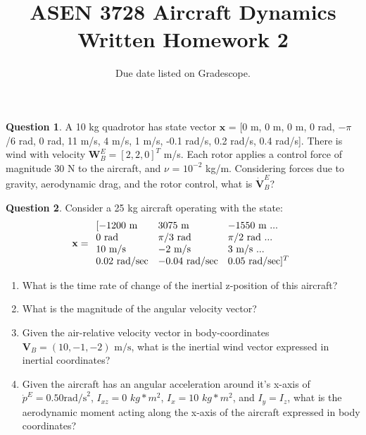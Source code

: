 \documentclass{article}
\title{ASEN 3728 Aircraft Dynamics\\Written Homework 2}
\date{Due date listed on Gradescope.}
\theoremstyle{definition}
\newtheorem{question}{Question}
\begin{document}

\maketitle

\begin{question}
    A 10 kg quadrotor has state vector $\mathbf{x}$ = [0 m, 0 m, 0 m, 0 rad, $-\pi$/6 rad, 0 rad, 11 m/s, 4 m/s, 1 m/s, -0.1 rad/s, 0.2 rad/s, 0.4 rad/s]. There is wind with velocity $\mathbf{W}_B^E = [2,2,0]^T$ m/s. Each rotor applies a control force of magnitude 30 N to the aircraft, and $\nu$ = $10^{-2}$ kg/m. Considering forces due to gravity, aerodynamic drag, and the rotor control, what is $\dot{\mathbf{V}}_B^E$?
\end{question}
\vspace{0.1cm}


\clearpage

\begin{question}

Consider a 25 kg aircraft operating with the state:
\begin{equation}
\nonumber
{\bf x} = 
\begin{array}{lll}
[-1200 \textrm{ m} & 3075 \textrm{ m} & -1550 \textrm{ m } ... \\
0 \textrm{ rad} & \pi/3 \textrm{ rad} & \pi/2 \textrm{ rad } ... \\
10 \textrm{ m/s} & -2 \textrm{ m/s} & 3 \textrm{ m/s } ... \\
0.02 \textrm{ rad/sec} & -0.04 \textrm{ rad/sec} & 0.05 \textrm{ rad/sec}]^T
\end{array}
\end{equation}

\begin{enumerate}[label=(\Alph*)]

\item What is the time rate of change of the inertial z-position of this aircraft?
\item What is the magnitude of the angular velocity vector?
\item Given the air-relative velocity vector in body-coordinates $\mathbf{V}_B = (10, -1, -2) \textrm{ m/s}$, what is the inertial wind vector expressed in inertial coordinates?

\item Given the aircraft has an angular acceleration around it's x-axis of $\dot{p}^E = 0.50 \textrm{rad/s}^2$, $I_{xz} = 0$ $kg*m^2$, $I_x = 10$ $kg* m^2$, and $I_y = I_z$, what is the aerodynamic moment acting along the x-axis of the aircraft expressed in body coordinates? 

\end{enumerate}

\end{question}
\end{document}
